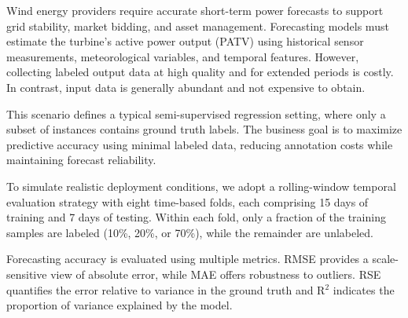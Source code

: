 Wind energy providers require accurate short-term power forecasts to support grid stability, market bidding, and asset management. Forecasting models must estimate the turbine's active power output (PATV) using historical sensor measurements, meteorological variables, and temporal features. However, collecting labeled output data at high quality and for extended periods is costly. In contrast, input data is generally abundant and not expensive to obtain.

This scenario defines a typical semi-supervised regression setting, where only a subset of instances contains ground truth labels. The business goal is to maximize predictive accuracy using minimal labeled data, reducing annotation costs while maintaining forecast reliability.

To simulate realistic deployment conditions, we adopt a rolling-window temporal evaluation strategy with eight time-based folds, each comprising 15 days of training and 7 days of testing. Within each fold, only a fraction of the training samples are labeled (10\%, 20\%, or 70\%), while the remainder are unlabeled.

Forecasting accuracy is evaluated using multiple metrics. RMSE provides a scale-sensitive view of absolute error, while MAE offers robustness to outliers. RSE quantifies the error relative to variance in the ground truth and R$^2$ indicates the proportion of variance explained by the model.